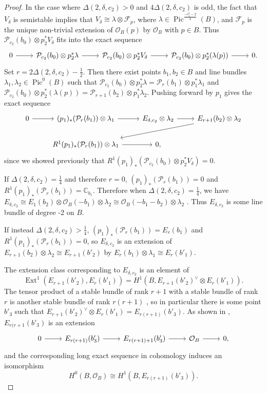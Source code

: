 \documentclass{article}[12pt]
\theoremstyle{definition}
\theoremstyle{remark}
\newcommand \C{\mathbb C}
\numberwithin{equation}{section}
\newcommand \mc{\mathcal}
\DeclareMathOperator{\Pic}{Pic}
\DeclareMathOperator{\Ext}{Ext}
\begin{document}
\begin{proof}
    In the case where $\Delta(2,\delta,c_2)>0$ and $4\Delta(2,\delta,c_2)$ is odd, the fact that $V_\delta$ is semistable implies that $V_\delta\cong \lambda\otimes \mc{F}_p$, where $\lambda \in \Pic^{\frac{-c_1^2-2}{4}}(B)$, and $\mc{F}_p$ is the unique non-trivial extension of $\mc{O}_{B}(p)$ by $\mc{O}_B$ with $p \in B$. Thus $\mc{P}_{c_2}(b_0)\otimes p_2^*V_\delta$ fits into the exact sequence $$\begin{tikzcd} 0 \arrow[r] & \mc{P}_{c_2}(b_0)\otimes p_2^*\lambda \arrow[r] & \mc{P}_{c_2}(b_0)\otimes p_2^*V_\delta \arrow[r] & \mc{P}_{c_2}(b_0)\otimes p_2^*(\lambda(p)) \arrow[r] & 0.
    \end{tikzcd}$$
    Set $r=2\Delta(2,\delta,c_2)-\frac{1}{2}.$ Then there exist points $b_1,b_2\in B$ and line bundles $\lambda_1, \lambda_2 \in \Pic^0(B)$ such that $\mc{P}_{c_2}(b_0)\otimes p_2^*\lambda=\mc{P}_r(b_1)\otimes p_1^*\lambda_1$ and $\mc{P}_{c_2}(b_0)\otimes p_2^*(\lambda(p))=\mc{P}_{r+1}(b_2)\otimes p_1^*\lambda_2$.
    Pushing forward by $p_1$ gives the exact sequence $$\begin{tikzcd}0 \arrow[r] & (p_1)_*(\mc{P}_{r}(b_1))\otimes \lambda_1 \arrow[r] & E_{\delta,c_2}\otimes \lambda_2 \arrow[r] & E_{r+1}(b_2)\otimes \lambda_2 \arrow[lld]\\
    & R^1(p_1)_*(\mc{P}_{r}(b_1))\otimes \lambda_1 \arrow[r] & 0,
    \end{tikzcd}$$
    since we showed previously that $R^1(p_1)_*(\mc{P}_{c_2}(b_0)\otimes p_2^*V_\delta)=0$.
    
    If $\Delta(2,\delta,c_2)=\frac{1}{4}$ and therefore $r=0$, $(p_1)_*(\mc{P}_r(b_1))=0$ and $R^1(p_1)_*(\mc{P}_r(b_1))=\C_{b_1}$. Therefore when $\Delta(2,\delta,c_2)=\frac{1}{4}$, we have $E_{\delta,c_2}\cong E_1(b_2)\otimes \mc{O}_B(-b_1)\otimes \lambda_2\cong \mc{O}_B(-b_1-b_2)\otimes \lambda_2$ \cite{CatCil}. Thus $E_{\delta,c_2}$ is some line bundle of degree -2 on $B$.
    
    If instead $\Delta(2,\delta,c_2)>\frac{1}{4}$, $(p_1)_*(\mc{P}_r(b_1))=E_r(b_1)$ and $R^1(p_1)_*(\mc{P}_r(b_1))=0$, so $E_{\delta,c_2}$ is an extension of $E_{r+1}(b_2)\otimes \lambda_2\cong E_{r+1}(b'_2)$ by $E_r(b_1)\otimes \lambda_1\cong E_r(b'_1)$.
    
    The extension class corresponding to $E_{\delta,c_2}$ is an element of $$\Ext^1(E_{r+1}(b'_2), E_r(b'_1))=H^1(B,E_{r+1}(b'_2)^\vee \otimes E_r(b'_1)).$$ The tensor product of a stable bundle of rank $r+1$ with a stable bundle of rank $r$ is another stable bundle of rank $r(r+1)$ \cite[Lemma 28]{Atiyah}, so in particular there is some point $b'_3$ such that $E_{r+1}(b'_2)^\vee \otimes E_r(b'_1)=E_{r(r+1)}(b'_3)$. As shown in \cite{CatCil}, $E_{r(r+1}(b'_3)$ is an extension $$\begin{tikzcd}0 \arrow[r] & E_{r(r+1)}(b'_3)\arrow[r] & E_{r(r+1)+1}(b'_3)\arrow[r] & \mc{O}_B \arrow[r] & 0,
    \end{tikzcd}$$
   and the corresponding long exact sequence in cohomology induces an isomorphism $$H^0(B,\mc{O}_B)\cong H^1(B,E_{r(r+1)}(b'_3)).$$
    

\end{proof}
\end{document}
